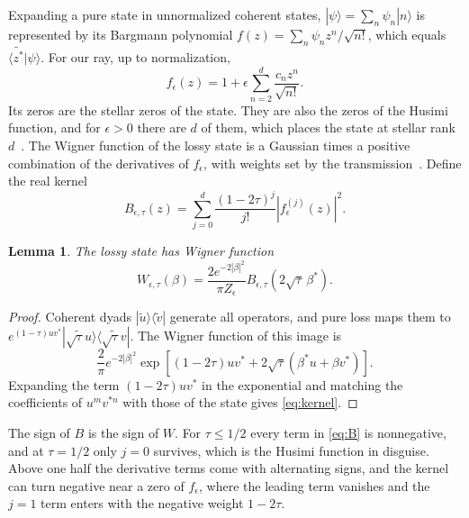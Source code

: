 \documentclass[11pt,a4paper]{article}
\newcommand{\ket}[1]{|#1\rangle}
\newcommand{\bra}[1]{\langle#1|}
\newtheorem{lemma}{Lemma}
\begin{document}
Expanding a pure state in unnormalized coherent states, $\ket\psi=\sum_n\psi_n\ket n$ is represented by its Bargmann polynomial $f(z)=\sum_n\psi_nz^n/\sqrt{n!}$, which equals $\langle\widetilde{z^*}|\psi\rangle$. For our ray, up to normalization,
\begin{equation}
 f_\epsilon(z)=1+\epsilon\sum_{n=2}^d\frac{c_n z^n}{\sqrt{n!}} .
 \label{eq:bargmann}
\end{equation}
Its zeros are the stellar zeros of the state. They are also the zeros of the Husimi function, and for $\epsilon>0$ there are $d$ of them, which places the state at stellar rank $d$~\cite{chabaud2020stellar}. The Wigner function of the lossy state is a Gaussian times a positive combination of the derivatives of $f_\epsilon$, with weights set by the transmission~\cite{parisio2008}. Define the real kernel
\begin{equation}
 B_{\epsilon,\tau}(z)=\sum_{j=0}^d\frac{(1-2\tau)^j}{j!}
                  |f_\epsilon^{(j)}(z)|^2 .
 \label{eq:B}
\end{equation}

\begin{lemma}
\label{lem:kernel}
The lossy state has Wigner function
\begin{equation}
 W_{\epsilon,\tau}(\beta)
 =\frac{2e^{-2|\beta|^2}}{\pi Z_\epsilon}
 B_{\epsilon,\tau}(2\sqrt\tau\,\beta^*).
 \label{eq:kernel}
\end{equation}
\end{lemma}
\begin{proof}
Coherent dyads $\ket{\widetilde u}\bra{\widetilde v}$ generate all operators, and pure loss maps them to
$e^{(1-\tau)uv^*}\ket{\widetilde{\sqrt\tau u}}\bra{\widetilde{\sqrt\tau v}}$.
The Wigner function of this image is
\begin{equation}
 \frac2\pi e^{-2|\beta|^2}
 \exp\!\left[(1-2\tau)uv^*+
             2\sqrt\tau(\beta^*u+\beta v^*)\right].
\end{equation}
Expanding the term $(1-2\tau)uv^*$ in the exponential and matching the coefficients of $u^mv^{*n}$ with those of the state gives \eqref{eq:kernel}.
\end{proof}

The sign of $B$ is the sign of $W$. For $\tau\le1/2$ every term in \eqref{eq:B} is nonnegative, and at $\tau=1/2$ only $j=0$ survives, which is the Husimi function in disguise. Above one half the derivative terms come with alternating signs, and the kernel can turn negative near a zero of $f_\epsilon$, where the leading term vanishes and the $j=1$ term enters with the negative weight $1-2\tau$.
\end{document}
